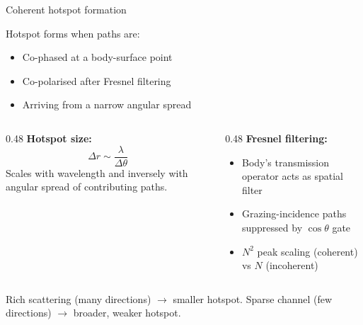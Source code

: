 \begin{frame}{Coherent hotspot formation}

  Hotspot forms when paths are:
  \begin{itemize}
    \item Co-phased at a body-surface point
    \item Co-polarised after Fresnel filtering
    \item Arriving from a narrow angular spread
  \end{itemize}

  \vspace{6pt}
  \begin{columns}[T]
    \begin{column}{0.48\textwidth}
      \textbf{Hotspot size:}
      \[
        \Delta r \sim \frac{\lambda}{\Delta\theta}
      \]
      Scales with wavelength and inversely with angular spread of contributing paths.
    \end{column}

    \begin{column}{0.48\textwidth}
      \textbf{Fresnel filtering:}
      \begin{itemize}
        \item Body's transmission operator acts as spatial filter
        \item Grazing-incidence paths suppressed by $\cos\theta$ gate
        \item $N^2$ peak scaling (coherent) vs $N$ (incoherent)
      \end{itemize}
    \end{column}
  \end{columns}

  \vspace{6pt}
  {\footnotesize Rich scattering (many directions) $\rightarrow$ smaller hotspot.
   Sparse channel (few directions) $\rightarrow$ broader, weaker hotspot.}
\end{frame}

